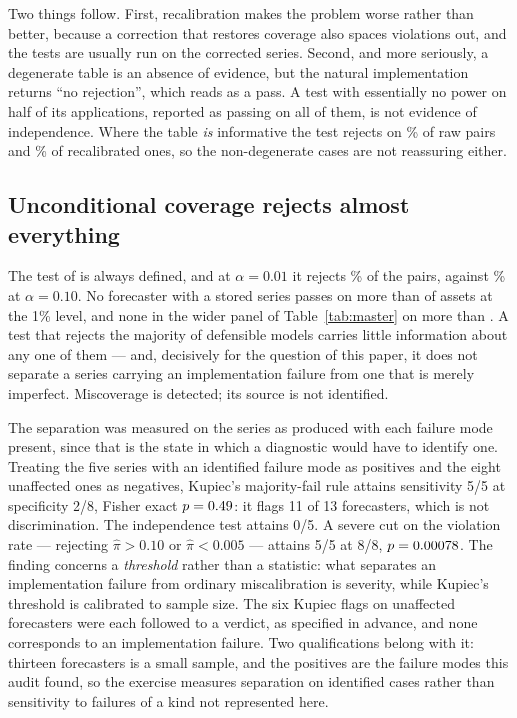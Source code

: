 \documentclass[preprint,11pt,authoryear]{elsarticle}
\newcommand{\1}{\boldsymbol{1}}
\begin{document}
Two things follow. First, recalibration makes the problem worse rather than
better, because a correction that restores coverage also spaces violations out,
and the tests are usually run on the corrected series. Second, and more
seriously, a degenerate table is an absence of evidence, but the natural
implementation returns ``no rejection'', which reads as a pass. A test with
essentially no power on half of its applications, reported as passing on all of
them, is not evidence of independence. Where the table \emph{is} informative the
test rejects on \nSeqCCRejRawOne\% of raw pairs and \nSeqCCRejCorOne\% of
recalibrated ones, so the non-degenerate cases are not reassuring either.

\subsection{Unconditional coverage rejects almost everything}
\label{sec:blindspot_kupiec}

The test of \citet{kupiec1995} is always defined, and at $\alpha = 0.01$ it
rejects \nSeqKupiecRejRawOne\% of the \nSeqPairs{} pairs, against
\nSeqKupiecRejRawTen\% at $\alpha = 0.10$. No forecaster with a stored series
passes on more than \nSeqBestKupiec{} of \nMainAssets{} assets at the 1\% level,
and none in the wider panel of Table~\ref{tab:master} on more than
\nMainBestKupiec. A test
that rejects the majority of defensible models carries little information about
any one of them --- and, decisively for the question of this paper, it does not
separate a series carrying an implementation failure from one that is merely
imperfect. Miscoverage is detected; its source is not identified.

The separation was measured on the series as produced with each failure mode
present, since that is the state in which a diagnostic would have to identify
one. Treating the five series with an identified failure mode as positives and
the eight unaffected ones as negatives, Kupiec's majority-fail rule attains
sensitivity 5/5 at specificity 2/8, Fisher exact $p = 0.49$: it flags
11 of 13 forecasters, which is not discrimination. The independence test attains
0/5. A severe cut on the violation rate --- rejecting $\hat\pi > 0.10$ or
$\hat\pi < 0.005$ --- attains 5/5 at 8/8, $p = 0.00078$. The finding
concerns a \emph{threshold} rather than a statistic: what separates an
implementation failure from ordinary miscalibration is severity, while Kupiec's
threshold is calibrated to sample size. The six Kupiec flags on unaffected
forecasters were each followed to a verdict, as specified in advance, and none
corresponds to an implementation failure. Two qualifications belong with it:
thirteen forecasters is a small sample, and the positives are the failure modes
this audit found, so the exercise measures separation on identified cases rather
than sensitivity to failures of a kind not represented here.
\end{document}
